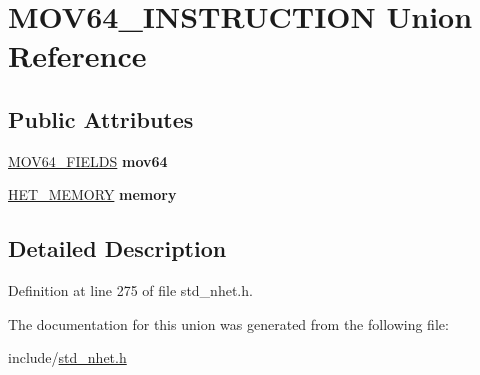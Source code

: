 \hypertarget{unionMOV64__INSTRUCTION}{}\section{M\+O\+V64\+\_\+\+I\+N\+S\+T\+R\+U\+C\+T\+I\+ON Union Reference}
\label{unionMOV64__INSTRUCTION}
\subsection*{Public Attributes}
\begin{DoxyCompactItemize}
\item 
\mbox{\label{unionMOV64__INSTRUCTION_abbfdc4db4c42e65564e1d516d8ffa64f}} 
\mbox{\hyperlink{structmov64__format}{M\+O\+V64\+\_\+\+F\+I\+E\+L\+DS}} {\bfseries mov64}
\item 
\mbox{\label{unionMOV64__INSTRUCTION_af1332869b4112caf710fad63dfd1c7c5}} 
\mbox{\hyperlink{structmemory__format}{H\+E\+T\+\_\+\+M\+E\+M\+O\+RY}} {\bfseries memory}
\end{DoxyCompactItemize}


\subsection{Detailed Description}


Definition at line 275 of file std\+\_\+nhet.\+h.



The documentation for this union was generated from the following file\+:\begin{DoxyCompactItemize}
\item 
include/\mbox{\hyperlink{std__nhet_8h}{std\+\_\+nhet.\+h}}\end{DoxyCompactItemize}
